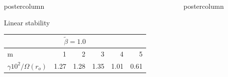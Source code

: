 \documentclass[final,hyperref={pdfpagelabels=false}]{beamer}
\newlength{\columnheight}
\begin{document}
\begin{frame}
\begin{columns}
\begin{column}{.49\textwidth}
\begin{beamercolorbox}[center,wd=\textwidth]{postercolumn}
\begin{minipage}[T]{.95\textwidth}
{\begin{block}{{\Large Linear stability}}
\begin{table}
                     \vspace{1in}

                     \begin{minipage}{\textwidth}
                       \begin{tabularx}{\textwidth}{l*{5}{R}} %
                          \\ \midrule
                         m                    & 1 & 2 & 3 & 4 & 5  \\ 
                         $\gamma10^2/\Omega(r_o)$ & 1.27 & 1.28 & 1.35 & 1.01 & 0.61   \\ \bottomrule
                       \end{tabularx}
                     \end{minipage}
                     \hfill
                   \end{table}

                   
            \end{block}
            \vfill
          }
        \end{minipage}
      \end{beamercolorbox}
    \end{column}
    
    \begin{column}{.49\textwidth}
      \begin{beamercolorbox}[center,wd=\textwidth]{postercolumn}
        \begin{minipage}[T]{.95\textwidth} %
          \parbox[t][\columnheight]{\textwidth}{ %
            
}
\end{minipage}
\end{beamercolorbox}
\end{column}
\end{columns}
\end{frame}
\end{document}
